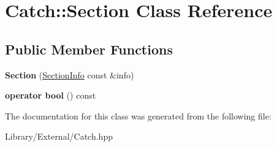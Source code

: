 \hypertarget{class_catch_1_1_section}{}\section{Catch\+:\+:Section Class Reference}
\label{class_catch_1_1_section}
\subsection*{Public Member Functions}
\begin{DoxyCompactItemize}
\item 
\hypertarget{class_catch_1_1_section_a68fd4e51e8981aaa7ddb00d8a6abd099}{}{\bfseries Section} (\hyperlink{struct_catch_1_1_section_info}{Section\+Info} const \&info)\label{class_catch_1_1_section_a68fd4e51e8981aaa7ddb00d8a6abd099}

\item 
\hypertarget{class_catch_1_1_section_a6c9be48e8ba0611c4aa601102e706f3b}{}{\bfseries operator bool} () const \label{class_catch_1_1_section_a6c9be48e8ba0611c4aa601102e706f3b}

\end{DoxyCompactItemize}


The documentation for this class was generated from the following file\+:\begin{DoxyCompactItemize}
\item 
Library/\+External/Catch.\+hpp\end{DoxyCompactItemize}
